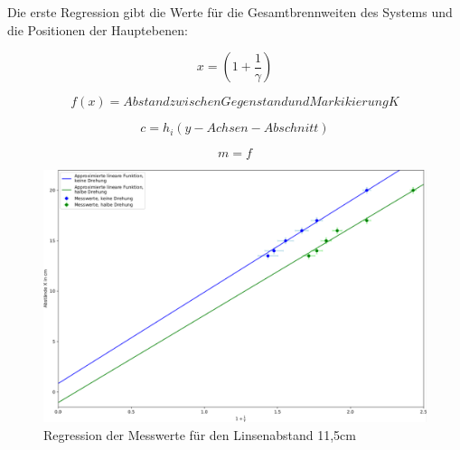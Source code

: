 Die erste Regression gibt die Werte für die Gesamtbrennweiten des Systems und die Positionen der Hauptebenen:

\begin{equation} \label{x}
    x = (1 + \frac{1}{\gamma})
\end{equation}

\begin{equation} \label{h}
    f(x) = Abstand zwischen Gegenstand und Markikierung K
\end{equation}

\begin{equation} \label{h}
    c = h_i (y-Achsen-Abschnitt)
\end{equation}

\begin{equation} \label{h}
    m = f
\end{equation}

\begin{figure}[h!]{}
    \begin{center}
        \includegraphics[scale=0.4]{./fig/Abbe_Reg_Messreihe1_Plot.pdf}
        \caption{Regression der Messwerte für den Linsenabstand 11,5cm}
        \label{fig:Abbe-Regress-S1}
    \end{center}
\end{figure}

